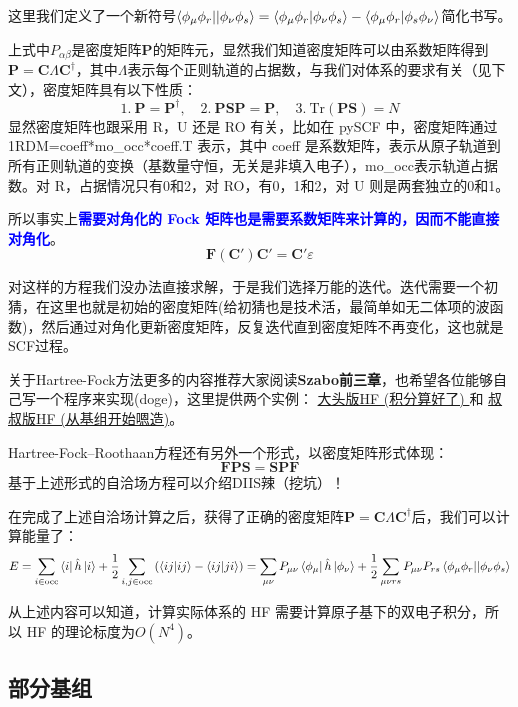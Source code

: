 这里我们定义了一个新符号$\bra{\phi_{\mu}\phi_r}\ket{|\phi_{\nu}\phi_s}=\bra{\phi_{\mu}\phi_r}\ket{\phi_{\nu}\phi_s}-\bra{\phi_{\mu}\phi_r}\ket{\phi_s\phi_{\nu}}$简化书写。

上式中$P_{\alpha\beta}$是密度矩阵$\mathbf{P}$的矩阵元，显然我们知道密度矩阵可以由系数矩阵得到$\mathbf{P}=\mathbf{C}\Lambda\mathbf{C}^{\dagger}$，其中$\Lambda$表示每个正则轨道的占据数，与我们对体系的要求有关（见下文），密度矩阵具有以下性质：
\[1. \ \mathbf{P}=\mathbf{P}^{\dagger}, \quad 2. \ \mathbf{P}\mathbf{S}\mathbf{P}=\mathbf{P}, \quad 3.\ \text{Tr}(\mathbf{P}\mathbf{S})=N\]
显然密度矩阵也跟采用 R，U 还是 RO 有关，比如在 pySCF 中，密度矩阵通过 1RDM=coeff*mo\_occ*coeff.T 表示，其中 coeff 是系数矩阵，表示从原子轨道到所有正则轨道的变换（基数量守恒，无关是非填入电子），mo\_occ表示轨道占据数。对 R，占据情况只有0和2，对 RO，有0，1和2，对 U 则是两套独立的0和1。

所以事实上\textcolor{blue}{\textbf{需要对角化的 Fock 矩阵也是需要系数矩阵来计算的，因而不能直接对角化}}。
\[\mathbf{F}(\mathbf{C}')\mathbf{C}'=\mathbf{C}'\varepsilon\]

对这样的方程我们没办法直接求解，于是我们选择万能的迭代。迭代需要一个初猜，在这里也就是初始的密度矩阵(给初猜也是技术活，最简单如无二体项的波函数)，然后通过对角化更新密度矩阵，反复迭代直到密度矩阵不再变化，这也就是SCF过程。

关于Hartree-Fock方法更多的内容推荐大家阅读\textbf{Szabo前三章}，也希望各位能够自己写一个程序来实现(doge)，这里提供两个实例：
\href{https://github.com/yangdatou/hf-tutorial}{大头版HF (积分算好了) }和
\href{https://github.com/Walter-Feng/Hartree-Fock-in-CPP}{叔叔版HF (从基组开始嗯造)}。

Hartree-Fock–Roothaan方程还有另外一个形式，以密度矩阵形式体现：
\[\mathbf{F}\mathbf{P}\mathbf{S}=\mathbf{S}\mathbf{P}\mathbf{F}\]
基于上述形式的自洽场方程可以介绍DIIS辣（挖坑）！

在完成了上述自洽场计算之后，获得了正确的密度矩阵$\mathbf{P}=\mathbf{C}\Lambda\mathbf{C}^{\dagger}$后，我们可以计算能量了：
\[E=\sum_{i\in\rm{occ}}\bra{i}\hat{h}\ket{i}+\frac{1}{2}\sum_{i,j\in\rm{occ}}\left(\bra{ij}\ket{ij}-\bra{ij}\ket{ji}\right)=\sum_{\mu\nu}P_{\mu\nu}\bra{\phi_{\mu}}\hat{h}\ket{\phi_{\nu}}+\frac{1}{2}\sum_{\mu\nu rs}P_{\mu\nu}P_{rs}\bra{\phi_{\mu}\phi_r}\ket{|\phi_{\nu}\phi_s}\]

从上述内容可以知道，计算实际体系的 HF 需要计算原子基下的双电子积分，所以 HF 的理论标度为$O(N^4)$。

\subsection{部分基组}
